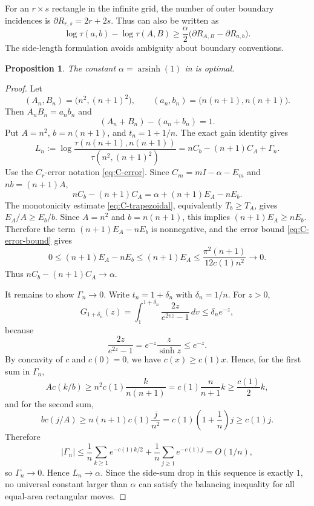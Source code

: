 \documentclass[11pt]{article}
\numberwithin{equation}{section}
\newtheorem{proposition}[proposition]{Proposition}
\DeclareMathOperator{\arsinh}{arsinh}
\newcommand{\dd}{\,d}
\begin{document}
For an $r\times s$ rectangle in the infinite grid, the number of outer boundary incidences is $\partial R_{r,s}=2r+2s$.
Thus  can also be written as
\[
  \log\tau(a,b)-\log\tau(A,B)
  \ge
  \frac{\alpha}{2}
  \bigl(\partial R_{A,B}-\partial R_{a,b}\bigr).
\]
The side-length formulation avoids ambiguity about boundary conventions.

\begin{proposition}\label{prop:optimality}
The constant $\alpha=\arsinh(1)$ in  is optimal.
\end{proposition}

\begin{proof}
Let
\[
  (A_n,B_n)=\bigl(n^2,(n+1)^2\bigr),
  \qquad
  (a_n,b_n)=\bigl(n(n+1),n(n+1)\bigr).
\]
Then $A_nB_n=a_nb_n$ and
\[
  (A_n+B_n)-(a_n+b_n)=1.
\]
Put $A=n^2$, $b=n(n+1)$, and $t_n=1+1/n$. The exact gain identity gives
\[
  L_n
  :=
  \log\frac{\tau(n(n+1),n(n+1))}
  {\tau(n^2,(n+1)^2)}
  =
  nC_b-(n+1)C_A+\Gamma_n.
\]
Use the $C_r$-error notation \eqref{eq:C-error}. Since $C_m=mI-\alpha-E_m$ and $nb=(n+1)A$,
\[
  nC_b-(n+1)C_A
  =
  \alpha+(n+1)E_A-nE_b.
\]
The monotonicity estimate \eqref{eq:C-trapezoidal}, equivalently $T_b\ge T_A$, gives $E_A/A\ge E_b/b$. Since $A=n^2$ and $b=n(n+1)$, this implies $(n+1)E_A\ge nE_b$. Therefore the term $(n+1)E_A-nE_b$ is nonnegative, and the error bound \eqref{eq:C-error-bound} gives
\[
  0\le (n+1)E_A-nE_b
  \le
  (n+1)E_A
  \le
  \frac{\pi^2(n+1)}{12c(1)n^2}
  \to0.
\]
Thus $nC_b-(n+1)C_A\to\alpha$.

It remains to show $\Gamma_n\to0$. Write $t_n=1+\delta_n$ with $\delta_n=1/n$. For $z>0$,
\[
  G_{1+\delta_n}(z)
  =
  \int_1^{1+\delta_n}\frac{2z}{e^{2vz}-1}\dd v
  \le
  \delta_n e^{-z},
\]
because
\[
  \frac{2z}{e^{2z}-1}
  =
  e^{-z}\frac{z}{\sinh z}
  \le e^{-z}.
\]
By concavity of $c$ and $c(0)=0$, we have $c(x)\ge c(1)x$. Hence, for the first sum in $\Gamma_n$,
\[
  A c(k/b)
  \ge
  n^2c(1)\frac{k}{n(n+1)}
  =
  c(1)\frac{n}{n+1}k
  \ge
  \frac{c(1)}2 k,
\]
and for the second sum,
\[
  b c(j/A)
  \ge
  n(n+1)c(1)\frac{j}{n^2}
  =
  c(1)\left(1+\frac1n\right)j
  \ge
  c(1)j.
\]
Therefore
\[
  |\Gamma_n|
  \le
  \frac1n\sum_{k\ge1}e^{-c(1)k/2}
  +
  \frac1n\sum_{j\ge1}e^{-c(1)j}
  =
  O(1/n),
\]
so $\Gamma_n\to0$. Hence $L_n\to\alpha$. Since the side-sum drop in this sequence is exactly $1$, no universal constant larger than $\alpha$ can satisfy the balancing inequality for all equal-area rectangular moves.
\end{proof}
\end{document}

